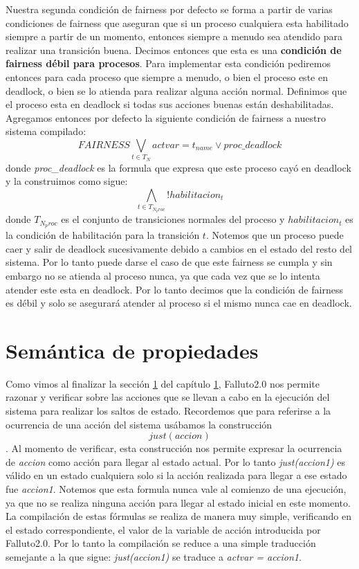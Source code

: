 \documentclass[titlepage, 12pt]{book}
\begin{document}
Nuestra segunda condici\'on de fairness por defecto se forma a partir de varias condiciones de fairness que aseguran que si un proceso cualquiera esta habilitado siempre a partir de un momento, entonces siempre a menudo sea atendido para realizar una transici\'on buena. Decimos entonces que esta es una \textbf{condici\'on de fairness d\'ebil para procesos}. Para implementar esta condici\'on pediremos entonces para cada proceso que siempre a menudo, o bien el proceso este en deadlock, o bien se lo atienda para realizar alguna acci\'on normal. Definimos que el proceso esta en deadlock si todas sus acciones buenas est\'an deshabilitadas. Agregamos entonces por defecto la siguiente condici\'on de fairness a nuestro sistema compilado:
$$FAIRNESS \bigvee_{t \in T_N} actvar = t_{name} \vee proc\_deadlock$$
donde \textit{proc\_deadlock} es la formula que expresa que este proceso cay\'o en deadlock y la construimos como sigue:
$$\bigwedge_{t \in T_{N_proc}}! habilitacion_{t}$$
donde $T_{N_proc}$ es el conjunto de transiciones normales del proceso y $habilitacion_{t}$ es la condici\'on de habilitaci\'on para la transici\'on $t$. Notemos que un proceso puede caer y salir de deadlock sucesivamente debido a cambios en el estado del resto del sistema. Por lo tanto puede darse el caso de que este fairness se cumpla y sin embargo no se atienda al proceso nunca, ya que cada vez que se lo intenta atender este esta en deadlock. Por lo tanto decimos que la condici\'on de fairness es d\'ebil y solo se asegurar\'a atender al proceso si el mismo nunca cae en deadlock.


\section{Sem\'antica de propiedades}
Como vimos al finalizar la secci\'on \ref{} del cap\'itulo \ref{}, Falluto2.0 nos permite razonar y verificar sobre las acciones que se llevan a cabo en la ejecuci\'on del sistema para realizar los saltos de estado. Recordemos que para referirse a la ocurrencia de una acci\'on del sistema us\'abamos la construcci\'on $$just(accion)$$. Al momento de verificar, esta construcci\'on nos permite expresar la ocurrencia de \textit{accion} como acci\'on para llegar al estado actual. Por lo tanto \textit{just(accion1)} es v\'alido en un estado cualquiera solo si la acci\'on realizada para llegar a ese estado fue \textit{accion1}. Notemos que esta formula nunca vale al comienzo de una ejecuci\'on, ya que no se realiza ninguna acci\'on para llegar al estado inicial en este momento. La compilaci\'on de estas f\'ormulas se realiza de manera muy simple, verificando en el estado correspondiente, el valor de la variable de acci\'on introducida por Falluto2.0. Por lo tanto la compilaci\'on se reduce a una simple traducci\'on semejante a la que sigue: \textit{just(accion1)} se traduce a \textit{actvar = accion1}.\\
\end{document}
